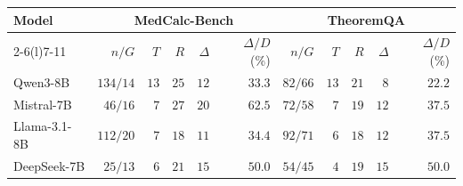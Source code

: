 \begin{tabular*}{\textwidth}{@{\extracolsep{\fill}}lrrrrrrrrrr@{}}
\toprule
Model & \multicolumn{5}{c}{MedCalc-Bench} & \multicolumn{5}{c}{TheoremQA} \\
\cmidrule(lr){2-6}\cmidrule(l){7-11}
 & $n/G$ & $T$ & $R$ & $\Delta$ & $\Delta/D$ (\%) & $n/G$ & $T$ & $R$ & $\Delta$ & $\Delta/D$ (\%) \\
\midrule
Qwen3-8B & $134/14$ & $13$ & $25$ & $12$ & $33.3$ & $82/66$ & $13$ & $21$ & $8$ & $22.2$ \\
Mistral-7B & $46/16$ & $7$ & $27$ & $20$ & $62.5$ & $72/58$ & $7$ & $19$ & $12$ & $37.5$ \\
Llama-3.1-8B & $112/20$ & $7$ & $18$ & $11$ & $34.4$ & $92/71$ & $6$ & $18$ & $12$ & $37.5$ \\
DeepSeek-7B & $25/13$ & $6$ & $21$ & $15$ & $50.0$ & $54/45$ & $4$ & $19$ & $15$ & $50.0$ \\
\bottomrule
\end{tabular*}
